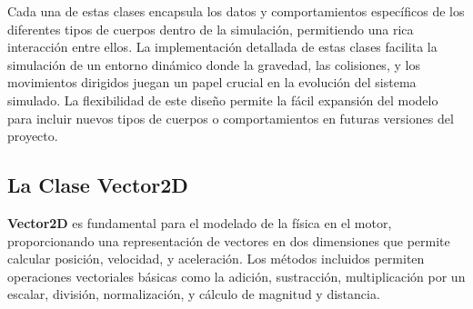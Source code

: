 Cada una de estas clases encapsula los datos y comportamientos específicos de los diferentes tipos de cuerpos dentro de la simulación, permitiendo una rica interacción entre ellos. La implementación detallada de estas clases facilita la simulación de un entorno dinámico donde la gravedad, las colisiones, y los movimientos dirigidos juegan un papel crucial en la evolución del sistema simulado. La flexibilidad de este diseño permite la fácil expansión del modelo para incluir nuevos tipos de cuerpos o comportamientos en futuras versiones del proyecto.
\subsection{La Clase Vector2D}
\textbf{Vector2D} es fundamental para el modelado de la física en el motor, proporcionando una representación de vectores en dos dimensiones que permite calcular posición, velocidad, y aceleración. Los métodos incluidos permiten operaciones vectoriales básicas como la adición, sustracción, multiplicación por un escalar, división, normalización, y cálculo de magnitud y distancia.

